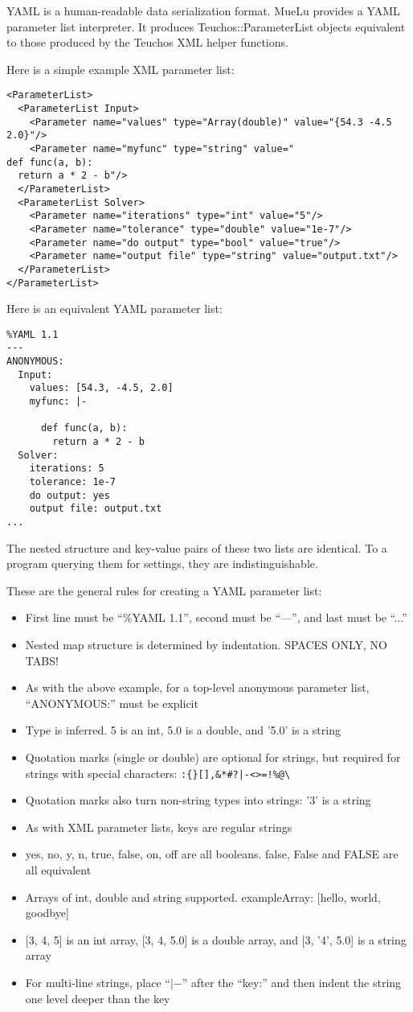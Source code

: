 YAML is a human-readable data serialization format. MueLu provides a
YAML parameter list interpreter. It produces Teuchos::ParameterList
objects equivalent to those produced by the Teuchos XML helper functions.

Here is a simple example XML parameter list:
\begin{verbatim}
<ParameterList>
  <ParameterList Input>
    <Parameter name="values" type="Array(double)" value="{54.3 -4.5 2.0}"/>
    <Parameter name="myfunc" type="string" value="
def func(a, b):
  return a * 2 - b"/>
  </ParameterList>
  <ParameterList Solver>
    <Parameter name="iterations" type="int" value="5"/>
    <Parameter name="tolerance" type="double" value="1e-7"/>
    <Parameter name="do output" type="bool" value="true"/>
    <Parameter name="output file" type="string" value="output.txt"/>
  </ParameterList>
</ParameterList>
\end{verbatim}

Here is an equivalent YAML parameter list:
\begin{verbatim}
%YAML 1.1
---
ANONYMOUS:
  Input:
    values: [54.3, -4.5, 2.0]
    myfunc: |-

      def func(a, b):
        return a * 2 - b
  Solver:
    iterations: 5
    tolerance: 1e-7
    do output: yes
    output file: output.txt
...
\end{verbatim}

The nested structure and key-value pairs of these two lists are identical.
To a program querying them for settings, they are indistinguishable.

These are the general rules for creating a YAML parameter list:
\begin{itemize}
\item First line must be ``\%YAML 1.1'', second must be ``---'', and last must be ``...''
\item Nested map structure is determined by indentation. SPACES ONLY, NO TABS!
\item As with the above example, for a top-level anonymous parameter list, ``ANONYMOUS:'' must be explicit
\item Type is inferred. 5 is an int, 5.0 is a double, and '5.0' is a string
\item Quotation marks (single or double) are optional for strings, but required for strings with special characters: \verb.:{}[],&*#?|-<>=!%@\.
\item Quotation marks also turn non-string types into strings: '3' is a string
\item As with XML parameter lists, keys are regular strings
\item yes, no, y, n, true, false, on, off are all booleans. false, False and FALSE are all equivalent
\item Arrays of int, double and string supported. exampleArray: {[}hello, world, goodbye{]}
\item {[}3, 4, 5{]} is an int array, {[}3, 4, 5.0{]} is a double array, and {[}3, '4', 5.0{]} is a string array
\item For multi-line strings, place ``$|-$'' after the ``key:'' and then indent the string one level deeper than the key
\end{itemize}
